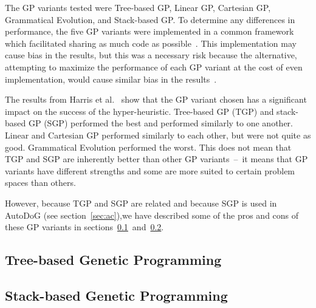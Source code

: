 \documentclass{sig-alternate}
\begin{document}
The GP variants tested were Tree-based GP, Linear GP, Cartesian GP, Grammatical Evolution, and Stack-based GP. To determine any differences in performance, the five GP variants were implemented in a common framework which facilitated sharing as much code as possible~\cite{harris:2015}. This implementation may cause bias in the results, but this was a necessary risk because the alternative, attempting to maximize the performance of each GP variant at the cost of even implementation, would cause similar bias in the results~\cite{harris:2015}.

The results from Harris et al.~\cite{harris:2015} show that the GP variant chosen has a significant impact on the success of the hyper-heuristic. Tree-based GP (TGP) and stack-based GP (SGP) performed the best and performed similarly to one another. Linear and Cartesian GP performed similarly to each other, but were not quite as good. Grammatical Evolution performed the worst. This does not mean that TGP and SGP are inherently better than other GP variants~--~it means that GP variants have different strengths and some are more suited to certain problem spaces than others.

However, because TGP and SGP are related and because SGP is used in AutoDoG (see section~\ref{sec:ac}),we have described some of the pros and cons of these GP variants in sections~\ref{sec:tgp}~and~\ref{sec:sgp}.


\subsection{Tree-based Genetic Programming}
\label{sec:tgp}

\subsection{Stack-based Genetic Programming}
\label{sec:sgp}
\end{document}

